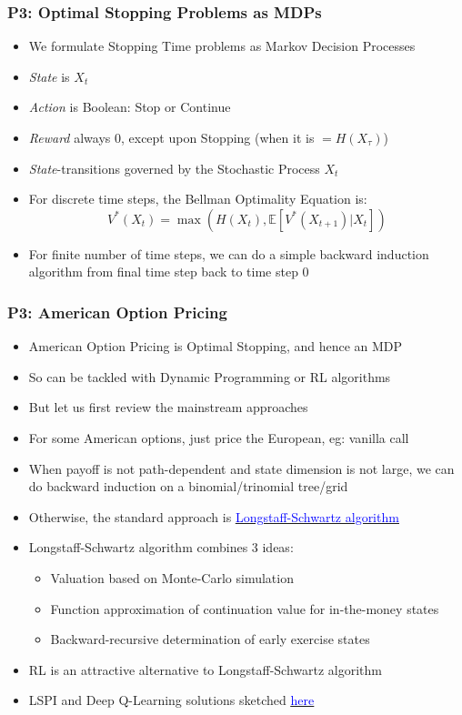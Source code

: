 \documentclass[handout]{beamer}
\begin{document}
\begin{frame}
\frametitle{P3: Optimal Stopping Problems as MDPs}
\pause
\begin{itemize}[<+->]
\item We formulate Stopping Time problems as Markov Decision Processes
\item {\em State} is $X_t$
\item {\em Action} is Boolean: Stop or Continue
\item {\em Reward} always 0, except upon Stopping (when it is $=H(X_{\tau})$)
\item {\em State}-transitions governed by the Stochastic Process $X_t$
\item For discrete time steps, the Bellman Optimality Equation is:
$$V^*(X_t) = \max(H(X_t), \mathbb{E}[V^*(X_{t+1})|X_t])$$
\item For finite number of time steps, we can do a simple backward induction algorithm from final time step back to time step 0
\end{itemize}
\end{frame}


\begin{frame}
\frametitle{P3: American Option Pricing}
\pause
\begin{itemize}[<+->]
\item American Option Pricing is Optimal Stopping, and hence an MDP
\item So can be tackled with Dynamic Programming or RL algorithms
\item But let us first review the mainstream approaches
\item For some American options, just price the European, eg: vanilla call
\item When payoff is not path-dependent and state dimension is not large, we can do backward induction on a binomial/trinomial tree/grid
\item Otherwise, the standard approach is \href{https://people.math.ethz.ch/~hjfurrer/teaching/LongstaffSchwartzAmericanOptionsLeastSquareMonteCarlo.pdf}{\underline{\textcolor{blue}{Longstaff-Schwartz algorithm}}}
\item Longstaff-Schwartz algorithm combines 3 ideas:
\begin{itemize}
\item Valuation based on Monte-Carlo simulation
\item Function approximation of continuation value for in-the-money states
\item Backward-recursive determination of early exercise states
\end{itemize}
\item RL is an attractive alternative to Longstaff-Schwartz algorithm
\item LSPI and Deep Q-Learning solutions sketched \href{https://github.com/coverdrive/technical-documents/blob/master/finance/cme241/Tour-Batch.pdf}{\underline{\textcolor{blue}{here}}}
\end{itemize}
\end{frame}
\end{document}
